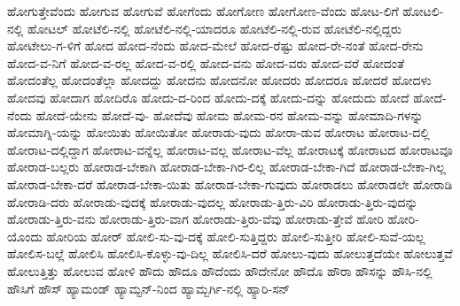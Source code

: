 {ಹೋಗುತ್ತೇವೆಂದು
ಹೋಗುವ
ಹೋಗುವೆ
ಹೋಗೆಂದು
ಹೋಗೋಣ
ಹೋಗೋಣ-ವೆಂದು
ಹೋಟ-ಲಿಗೆ
ಹೋಟಲಿ-ನಲ್ಲಿ
ಹೋಟಲ್
ಹೋಟೆಲಿ-ನಲ್ಲಿ
ಹೋಟೆಲಿ-ನಲ್ಲಿ-ಯಾದರೂ
ಹೋಟೆಲಿ-ನಲ್ಲಿ-ರುವ
ಹೋಟೆಲಿ-ನಲ್ಲಿದ್ದರು
ಹೋಟೇಲು-ಗ-ಳಿಗೆ
ಹೋದ
ಹೋದ-ನೆಂದು
ಹೋದ-ಮೇಲೆ
ಹೋದ-ರೆಷ್ಟು
ಹೋದ-ರೇ-ನಂತೆ
ಹೋದ-ರೇನು
ಹೋದ-ವ-ನಿಗೆ
ಹೋದ-ವ-ರಲ್ಲ
ಹೋದ-ವ-ರಲ್ಲಿ
ಹೋದ-ವನು
ಹೋದ-ವರು
ಹೋದ-ವರೆ
ಹೋದಂತೆ
ಹೋದಂತೆಲ್ಲ
ಹೋದಂತೆಲ್ಲಾ
ಹೋದದ್ದು
ಹೋದನು
ಹೋದನೋ
ಹೋದರು
ಹೋದರೂ
ಹೋದರೆ
ಹೋದಳು
ಹೋದವು
ಹೋದಾಗ
ಹೋದಿರೊ
ಹೋದು-ದ-ರಿಂದ
ಹೋದು-ದಕ್ಕೆ
ಹೋದು-ದನ್ನು
ಹೋದುದು
ಹೋದೆ
ಹೋದೆ-ನೆಂದು
ಹೋದೆ-ಯೇನು
ಹೋದೆ-ವು-
ಹೋದೆವು
ಹೋಮ
ಹೋಮ-ರನ
ಹೋಮ-ವನ್ನು
ಹೋಮಾದಿ-ಗಳನ್ನು
ಹೋಮಾಗ್ನಿ-ಯನ್ನು
ಹೋಯಿತು
ಹೋಯಿತೋ
ಹೋರಾಡು-ವುದು
ಹೋರಾ-ಡುವ
ಹೋರಾಟ
ಹೋರಾಟ-ದಲ್ಲಿ
ಹೋರಾಟ-ದಲ್ಲಿದ್ದಾಗ
ಹೋರಾಟ-ವನ್ನೆಲ್ಲ
ಹೋರಾಟ-ವಲ್ಲ
ಹೋರಾಟ-ವೆಲ್ಲ
ಹೋರಾಟಕ್ಕೆ
ಹೋರಾಟದ
ಹೋರಾಟವೂ
ಹೋರಾಡ-ಬಲ್ಲರು
ಹೋರಾಡ-ಬೇಕಾಗಿ
ಹೋರಾಡ-ಬೇಕಾ-ಗಿರ-ಲಿಲ್ಲ
ಹೋರಾಡ-ಬೇಕಾ-ಗಿದೆ
ಹೋರಾಡ-ಬೇಕಾ-ಗಿಲ್ಲ
ಹೋರಾಡ-ಬೇಕಾ-ದರೆ
ಹೋರಾಡ-ಬೇಕಾ-ಯಿತು
ಹೋರಾಡ-ಬೇಕಾ-ಗುವುದು
ಹೋರಾಡಲು
ಹೋರಾಡಲೇ
ಹೋರಾಡಿ
ಹೋರಾಡಿ-ದರು
ಹೋರಾಡು-ವುದಕ್ಕೆ
ಹೋರಾಡು-ವುದಲ್ಲ
ಹೋರಾಡು-ತ್ತಿರು-ವಿರಿ
ಹೋರಾಡು-ತ್ತಿರು-ವುದನ್ನು
ಹೋರಾಡು-ತ್ತಿರು-ವನು
ಹೋರಾಡು-ತ್ತಿರು-ವಾಗ
ಹೋರಾಡು-ತ್ತಿರು-ವೆವು
ಹೋರಾಡು-ತ್ತೇವೆ
ಹೋರಿ
ಹೋರಿ-ಯೊಂದು
ಹೋರಿಯ
ಹೋರ್
ಹೋಲಿ-ಸು-ವು-ದಕ್ಕೆ
ಹೋಲಿ-ಸುತ್ತಿದ್ದರು
ಹೋಲಿ-ಸುತ್ತೀರಿ
ಹೋಲಿ-ಸುವೆ-ಯಲ್ಲ
ಹೋಲಿಸ-ಬಲ್ಲೆ
ಹೋಲಿಸಿ
ಹೋಲಿಸಿ-ಕೊಳ್ಳು-ವು-ದಿಲ್ಲ
ಹೋಲಿಸಿ-ದರೆ
ಹೋಲು-ವುದು
ಹೋಲುತ್ತದೆಯೇ
ಹೋಲುತ್ತವೆ
ಹೋಲುತ್ತಿತ್ತು
ಹೋಲುವ
ಹೋಳಿ
ಹೌದು
ಹೌದೂ
ಹೌದೆಂದು
ಹೌದೇನೋ
ಹೌದೊ
ಹೌರಾ
ಹೌಸನ್ನು
ಹೌಸಿ-ನಲ್ಲಿ
ಹೌಸಿಗೆ
ಹೌಸ್
ಹ್ಯಾಮಂಡ್
ಹ್ಯಾಮ್ಟನ್-ನಿಂದ
ಹ್ಯಾಮ್ಬರ್ಗಿ-ನಲ್ಲಿ
ಹ್ಯಾರಿ-ಸನ್
}
